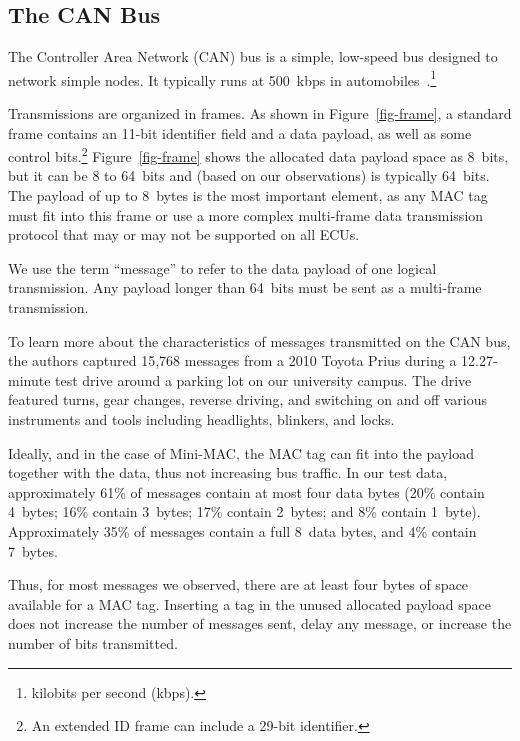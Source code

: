 
\subsection{The CAN Bus}
\label{can}

The Controller Area Network (CAN) bus 
is a simple, low-speed bus designed to network simple nodes. 
It typically runs at 500~kbps in automobiles~\cite{canbus}.\footnote{kilobits per second (kbps).}

Transmissions are organized in frames.  As shown in Figure~\ref{fig-frame}, 
a standard frame contains an 11-bit identifier field and 
a data payload, as well as some control bits.\footnote{An extended ID frame can
include a 29-bit identifier.}
Figure~\ref{fig-frame} 
shows the allocated data payload space as 8~bits, but
it can be 8 to 64~bits and (based on our observations) is typically 64~bits.
The payload of up to 8~bytes is the most important element, 
as any MAC tag must fit into this frame or use a more complex multi-frame data transmission protocol 
that may or may not be supported on all ECUs. 

We use the term ``message'' to refer to the data payload of one logical transmission.
Any payload longer than 64~bits must be sent as a multi-frame transmission.

To learn more about the characteristics of messages transmitted on the CAN bus, 
the authors captured 15,768 messages from a 2010 Toyota Prius during a 12.27-minute test drive 
around a parking lot on our university campus. 
The drive featured turns, gear changes, reverse driving, and switching on and off 
various instruments and tools including headlights, blinkers, and locks. 

Ideally, and in the case of Mini-MAC, the MAC tag
can fit into the payload together with the data, thus not increasing bus traffic. 
In our test data, 
approximately 61\% of messages contain at most four data bytes
(20\% contain 4~bytes; 16\% contain 3~bytes; 17\% contain 2~bytes; and 8\% contain 1~byte).
Approximately 35\% of messages contain a full 8~data bytes, and 4\% contain 7~bytes.

Thus, for most messages we observed, there are at least four bytes of space available for a MAC tag.
Inserting a tag in the unused allocated payload space does not
increase the number of messages sent,
delay any message,  or increase the number of bits transmitted.

